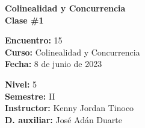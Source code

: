 \begin{center} \textbf
{
    \Large Colinealidad y Concurrencia \\ \vspace{2mm}Clase \#1
}
\end{center}

\begin{multicols}{2}
{
    \textbf{Encuentro:} 15\\
    \textbf{Curso:} Colinealidad y Concurrencia\\
    \textbf{Fecha:} 8 de junio de 2023\\
    \begin{flushright}
        \textbf{Nivel:} 5\\
        \textbf{Semestre:} II\\
        \textbf{Instructor:} Kenny Jordan Tinoco\\
        \textbf{D. auxiliar: }José Adán Duarte
    \end{flushright}
}
\end{multicols}

\thispagestyle{first-page-style}